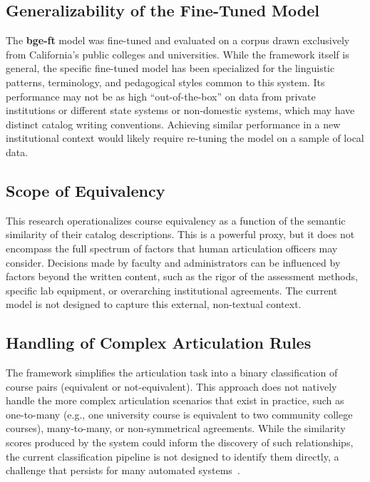 \subsection{Generalizability of the Fine-Tuned Model}\label{ch:5.2.2}
The \textbf{bge-ft} model was fine-tuned and evaluated on a corpus drawn exclusively from California's public colleges and universities. While the framework itself is general, the specific fine-tuned model has been specialized for the linguistic patterns, terminology, and pedagogical styles common to this system. Its performance may not be as high ``out-of-the-box'' on data from private institutions or different state systems or non-domestic systems, which may have distinct catalog writing conventions. Achieving similar performance in a new institutional context would likely require re-tuning the model on a sample of local data.

\subsection{Scope of Equivalency}\label{ch:5.2.3}
This research operationalizes course equivalency as a function of the semantic similarity of their catalog descriptions. This is a powerful proxy, but it does not encompass the full spectrum of factors that human articulation officers may consider. Decisions made by faculty and administrators can be influenced by factors beyond the written content, such as the rigor of the assessment methods, specific lab equipment, or overarching institutional agreements. The current model is not designed to capture this external, non-textual context.

\subsection{Handling of Complex Articulation Rules}\label{ch:5.2.4}
The framework simplifies the articulation task into a binary classification of course pairs (equivalent or not-equivalent). This approach does not natively handle the more complex articulation scenarios that exist in practice, such as one-to-many (e.g., one university course is equivalent to two community college courses), many-to-many, or non-symmetrical agreements. While the similarity scores produced by the system could inform the discovery of such relationships, the current classification pipeline is not designed to identify them directly, a challenge that persists for many automated systems~\cite{pardos10.1145/3330430.3333622}.

